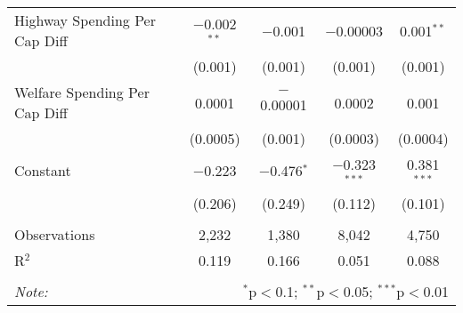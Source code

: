 \begin{table}[!htbp]
\begin{tabular}{@{\extracolsep{5pt}}lcccc}
  Highway Spending Per Cap Diff & $-$0.002$^{**}$ & $-$0.001 & $-$0.00003 & 0.001$^{**}$ \\ 
  & (0.001) & (0.001) & (0.001) & (0.001) \\ 
  Welfare Spending Per Cap Diff & 0.0001 & $-$0.00001 & 0.0002 & 0.001 \\ 
  & (0.0005) & (0.001) & (0.0003) & (0.0004) \\ 
  Constant & $-$0.223 & $-$0.476$^{*}$ & $-$0.323$^{***}$ & 0.381$^{***}$ \\ 
  & (0.206) & (0.249) & (0.112) & (0.101) \\ 
 \hline \\[-1.8ex] 
Observations & 2,232 & 1,380 & 8,042 & 4,750 \\ 
R$^{2}$ & 0.119 & 0.166 & 0.051 & 0.088 \\ 
\hline 
\hline \\[-1.8ex] 
\textit{Note:}  & \multicolumn{4}{r}{$^{*}$p$<$0.1; $^{**}$p$<$0.05; $^{***}$p$<$0.01} \\ 
\end{tabular} 
\end{table} 
